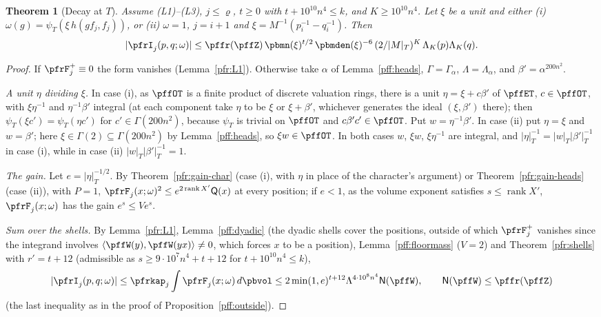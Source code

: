 \documentclass[10pt]{amsart}
\newtheorem{theorem}{Theorem}[section]
\theoremstyle{definition}
\theoremstyle{remark}
\begin{document}
\begin{theorem}[Decay at $T$]\label{pff:decay}
Assume (L1)--(L3), $j\le\varrho$, $t\ge0$ with $t+10^{10}n^4\le k$, and $K\ge10^{10}n^4$. Let $\xi$ be a
unit and either (i) $\omega(g)=\psi_T(\xi\,h(gf_j,f_j))$, or (ii) $\omega=1$, $j=i+1$ and
$\xi=M^{-1}(p_i^{-1}-q_i^{-1})$. Then
\[
|\pfrI_j(p,q;\omega)|\le\pffr(\pffZ)\,\pbmn(\xi)^{t/2}\,\pbmden(\xi)^{-6}\,(2/|M|_T)^K\,\Lambda_K(p)\Lambda_K(q).
\]
\end{theorem}
\begin{proof}
If $\pfrF^+_j\equiv0$ the form vanishes (Lemma~\ref{pfr:L1}). Otherwise take $\alpha$ of
Lemma~\ref{pff:heads}, $\Gamma=\Gamma_\alpha$, $\Lambda=\Lambda_\alpha$, and $\beta'=\alpha^{200n^2}$.

\emph{A unit $\eta$ dividing $\xi$.} In case (i), as $\pffOT$ is a finite product of discrete valuation
rings, there is a unit $\eta=\xi+c\beta'$ of $\pffET$, $c\in\pffOT$, with $\xi\eta^{-1}$ and $\eta^{-1}\beta'$
integral (at each component take $\eta$ to be $\xi$ or $\xi+\beta'$, whichever generates the ideal
$(\xi,\beta')$ there); then $\psi_T(\xi c')=\psi_T(\eta c')$ for $c'\in\Gamma(200n^2)$, because
$\psi_T$ is trivial on $\pffOT$ and $c\beta'c'\in\pffOT$. Put $w=\eta^{-1}\beta'$. In case (ii) put
$\eta=\xi$ and $w=\beta'$; here $\xi\in\Gamma(2)\subseteq\Gamma(200n^2)$ by Lemma~\ref{pff:heads}, so
$\xi w\in\pffOT$. In both cases $w$, $\xi w$, $\xi\eta^{-1}$ are integral, and $|\eta|_T^{-1}=|w|_T
|\beta'|_T^{-1}$ in case (i), while in case (ii) $|w|_T|\beta'|_T^{-1}=1$.

\emph{The gain.} Let $e=|\eta|_T^{-1/2}$. By Theorem~\ref{pfr:gain-char} (case (i), with $\eta$ in place
of the character's argument) or Theorem~\ref{pfr:gain-heads} (case (ii)), with $P=1$,
$\pfrF_j(x;\omega)^2\le e^{2\operatorname{rank}X'}\mathsf Q(x)$ at every position; if $e<1$, as the volume
exponent satisfies $s\le\operatorname{rank}X'$, $\pfrF_j(x;\omega)$ has the gain $e^{s}\le Ve^s$.

\emph{Sum over the shells.} By Lemma~\ref{pfr:L1}, Lemma~\ref{pff:dyadic} (the dyadic shells cover the
positions, outside of which $\pfrF_j^+$ vanishes since the integrand involves $\langle\pffW(y),\pffW(yx)
\rangle\ne0$, which forces $x$ to be a position), Lemma~\ref{pff:floormass} ($V=2$) and
Theorem~\ref{pfr:shells} with $r'=t+12$ (admissible as $s\ge9\cdot10^7n^4+t+12$ for $t+10^{10}n^4\le k$),
\[
|\pfrI_j(p,q;\omega)|\le\pfrkap_j\int\pfrF_j(x;\omega)\,d\pbvol\le2\min(1,e)^{t+12}\Lambda^{4\cdot10^8n^4}
\mathsf N(\pffW),\qquad\mathsf N(\pffW)\le\pffr(\pffZ)
\]
(the last inequality as in the proof of Proposition~\ref{pff:outside}).


\end{proof}
\end{document}
